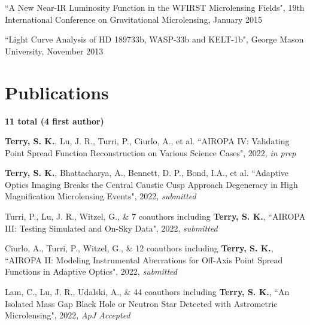 \documentclass[margin,line]{cv}
\begin{document}
\begin{resume}
\begin{etaremune}
\item ``A New Near-IR Luminosity Function in the WFIRST Microlensing Fields", 19th International Conference on Gravitational Microlensing, January 2015

\item ``Light Curve Analysis of HD 189733b, WASP-33b and KELT-1b", George Mason University, November 2013 \\

\end{etaremune}

\section{\sc Publications}
\textbf{11 total (4 first author)}\\
\begin{etaremune}

\item \textbf{Terry, S. K.}, Lu, J. R., Turri, P., Ciurlo, A., et al. ``AIROPA IV: Validating Point Spread Function Reconstruction on Various Science Cases", 2022, \textit{in prep}

\item \textbf{Terry, S. K.}, Bhattacharya, A., Bennett, D. P., Bond, I.A., et al. ``Adaptive Optics Imaging Breaks the Central Caustic Cusp Approach Degeneracy in High Magnification Microlensing Events", 2022, \textit{submitted}

\item Turri, P., Lu, J. R., Witzel, G., \& 7 coauthors including \textbf{Terry, S. K.}, ``AIROPA III: Testing Simulated and On-Sky Data", 2022, \textit{submitted}

\item Ciurlo, A., Turri, P., Witzel, G., \& 12 coauthors including \textbf{Terry, S. K.}, ``AIROPA II: Modeling Instrumental Aberrations for Off-Axis Point Spread Functions in Adaptive Optics", 2022, \textit{submitted}

\item Lam, C., Lu, J. R., Udalski, A., \& 44 coauthors including {\bf Terry, S. K.}, ``An Isolated Mass Gap Black Hole or Neutron Star Detected with Astrometric Microlensing", 2022, \textit{ApJ Accepted}


\end{etaremune}
\end{resume}
\end{document}
